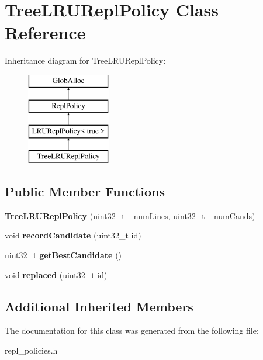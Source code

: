 \hypertarget{classTreeLRUReplPolicy}{\section{Tree\-L\-R\-U\-Repl\-Policy Class Reference}
\label{classTreeLRUReplPolicy}
}
Inheritance diagram for Tree\-L\-R\-U\-Repl\-Policy\-:\begin{figure}[H]
\begin{center}
\leavevmode
\includegraphics[height=4.000000cm]{classTreeLRUReplPolicy}
\end{center}
\end{figure}
\subsection*{Public Member Functions}
\begin{DoxyCompactItemize}
\item 
\hypertarget{classTreeLRUReplPolicy_a07468e4e2edb9edd9bc3f29864d63075}{{\bfseries Tree\-L\-R\-U\-Repl\-Policy} (uint32\-\_\-t \-\_\-num\-Lines, uint32\-\_\-t \-\_\-num\-Cands)}\label{classTreeLRUReplPolicy_a07468e4e2edb9edd9bc3f29864d63075}

\item 
\hypertarget{classTreeLRUReplPolicy_adb6bc8ec56424ee471f3c06ce13fab50}{void {\bfseries record\-Candidate} (uint32\-\_\-t id)}\label{classTreeLRUReplPolicy_adb6bc8ec56424ee471f3c06ce13fab50}

\item 
\hypertarget{classTreeLRUReplPolicy_a5fefd60405b952899c288bdcda374d88}{uint32\-\_\-t {\bfseries get\-Best\-Candidate} ()}\label{classTreeLRUReplPolicy_a5fefd60405b952899c288bdcda374d88}

\item 
\hypertarget{classTreeLRUReplPolicy_a9b61f58c5e24ad304fcb4ca005160f24}{void {\bfseries replaced} (uint32\-\_\-t id)}\label{classTreeLRUReplPolicy_a9b61f58c5e24ad304fcb4ca005160f24}

\end{DoxyCompactItemize}
\subsection*{Additional Inherited Members}


The documentation for this class was generated from the following file\-:\begin{DoxyCompactItemize}
\item 
repl\-\_\-policies.\-h\end{DoxyCompactItemize}
